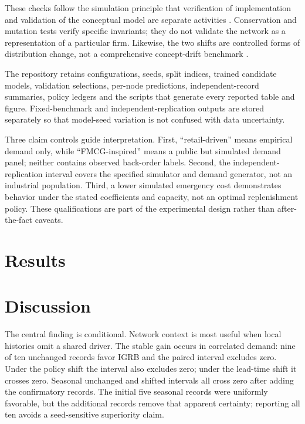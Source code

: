 \documentclass[11pt,a4paper]{article}
\begin{document}
These checks follow the simulation principle that verification of implementation and validation of the conceptual model are separate activities \cite{sargent}. Conservation and mutation tests verify specific invariants; they do not validate the network as a representation of a particular firm. Likewise, the two shifts are controlled forms of distribution change, not a comprehensive concept-drift benchmark \cite{gama}.

The repository retains configurations, seeds, split indices, trained candidate models, validation selections, per-node predictions, independent-record summaries, policy ledgers and the scripts that generate every reported table and figure. Fixed-benchmark and independent-replication outputs are stored separately so that model-seed variation is not confused with data uncertainty.

Three claim controls guide interpretation. First, ``retail-driven'' means empirical demand only, while ``FMCG-inspired'' means a public but simulated demand panel; neither contains observed back-order labels. Second, the independent-replication interval covers the specified simulator and demand generator, not an industrial population. Third, a lower simulated emergency cost demonstrates behavior under the stated coefficients and capacity, not an optimal replenishment policy. These qualifications are part of the experimental design rather than after-the-fact caveats.

\section{Results}

\section{Discussion}
The central finding is conditional. Network context is most useful when local histories omit a shared driver. The stable gain occurs in correlated demand: nine of ten unchanged records favor IGRB and the paired interval excludes zero. Under the policy shift the interval also excludes zero; under the lead-time shift it crosses zero. Seasonal unchanged and shifted intervals all cross zero after adding the confirmatory records. The initial five seasonal records were uniformly favorable, but the additional records remove that apparent certainty; reporting all ten avoids a seed-sensitive superiority claim.
\end{document}
